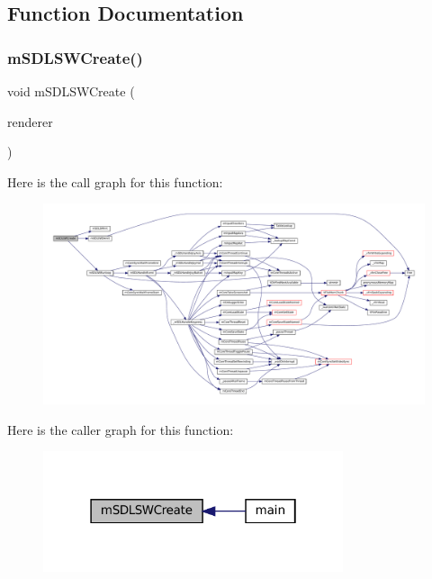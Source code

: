 \subsection{Function Documentation}
\mbox{\label{sw-sdl_8c_a944f8c2784dcc50f705cd99f98609ee4}} 
\subsubsection{\texorpdfstring{m\+S\+D\+L\+S\+W\+Create()}{mSDLSWCreate()}}
{\footnotesize\ttfamily void m\+S\+D\+L\+S\+W\+Create (\begin{DoxyParamCaption}\item[{struct \mbox{\hyperlink{structm_s_d_l_renderer}{m\+S\+D\+L\+Renderer}} $\ast$}]{renderer }\end{DoxyParamCaption})}

Here is the call graph for this function\+:
\nopagebreak
\begin{figure}[H]
\begin{center}
\leavevmode
\includegraphics[width=350pt]{sw-sdl_8c_a944f8c2784dcc50f705cd99f98609ee4_cgraph}
\end{center}
\end{figure}
Here is the caller graph for this function\+:
\nopagebreak
\begin{figure}[H]
\begin{center}
\leavevmode
\includegraphics[width=250pt]{sw-sdl_8c_a944f8c2784dcc50f705cd99f98609ee4_icgraph}
\end{center}
\end{figure}
\mbox{\label{sw-sdl_8c_a7ecb29d26edf8f1b3dfbec39f86d0310}} 
